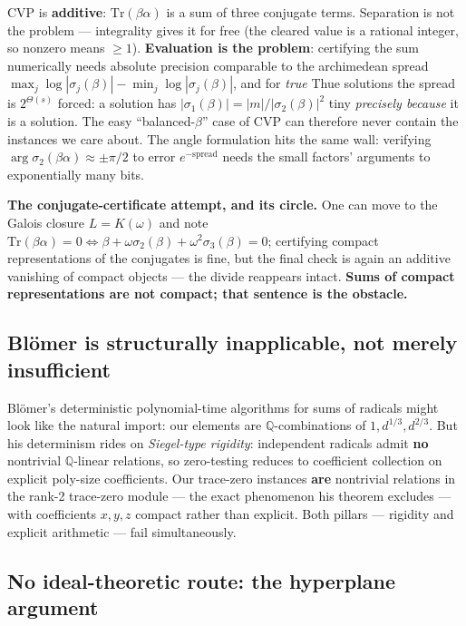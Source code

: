 \documentclass[11pt]{amsart}
\theoremstyle{plain}
\theoremstyle{remark}
\begin{document}
CVP is \textbf{additive}: $\mathrm{Tr}(\beta\alpha)$ is a sum of
three conjugate terms. Separation is not the problem --- integrality
gives it for free (the cleared value is a rational integer, so
nonzero means $\ge 1$). \textbf{Evaluation is the problem}:
certifying the sum numerically needs absolute precision comparable to
the archimedean spread
$\max_j \log|\sigma_j(\beta)| - \min_j \log|\sigma_j(\beta)|$, and
for \emph{true} Thue solutions the spread is $2^{\Theta(s)}$ forced:
a solution has $|\sigma_1(\beta)| = |m|/|\sigma_2(\beta)|^2$ tiny
\emph{precisely because} it is a solution. The easy
``balanced-$\beta$'' case of CVP can therefore never contain the
instances we care about. The angle formulation hits the same wall:
verifying $\arg \sigma_2(\beta\alpha) \approx \pm\pi/2$ to error
$e^{-\mathrm{spread}}$ needs the small factors' arguments to
exponentially many bits.

\textbf{The conjugate-certificate attempt, and its circle.} One can
move to the Galois closure $L = K(\omega)$ and note
$\mathrm{Tr}(\beta\alpha) = 0 \iff \beta + \omega\sigma_2(\beta) +
\omega^2\sigma_3(\beta) = 0$; certifying compact representations of
the conjugates is fine, but the final check is again an additive
vanishing of compact objects --- the divide reappears intact.
\textbf{Sums of compact representations are not compact; that
sentence is the obstacle.}

\subsection{Bl\"omer is structurally inapplicable, not merely
insufficient}\label{sec:blomer}

Bl\"omer's deterministic polynomial-time algorithms for sums of
radicals \cite{Blo91,Blo93} might look like the natural import: our
elements are $\mathbb{Q}$-combinations of $1, d^{1/3}, d^{2/3}$. But
his determinism rides on \emph{Siegel-type rigidity}: independent
radicals admit \textbf{no} nontrivial $\mathbb{Q}$-linear relations,
so zero-testing reduces to coefficient collection on explicit
poly-size coefficients. Our trace-zero instances \textbf{are}
nontrivial relations in the rank-2 trace-zero module --- the exact
phenomenon his theorem excludes --- with coefficients $x, y, z$
compact rather than explicit. Both pillars --- rigidity and explicit
arithmetic --- fail simultaneously.

\subsection{No ideal-theoretic route: the hyperplane argument}
\label{sec:hyperplane}
\end{document}

